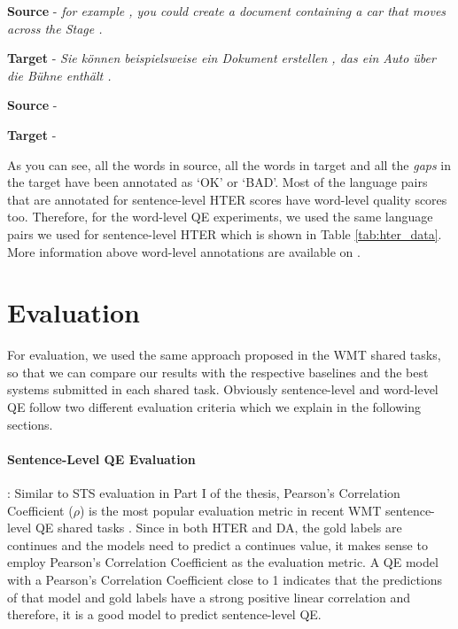 \noindent \textbf{Source} - \textit{for example , you could create a document containing a car that moves across the Stage .}

\noindent \textbf{Target} - \textit{Sie können beispielsweise ein Dokument erstellen , das ein Auto über die Bühne enthält .}


\noindent \textbf{Source} - \textit{  \hlgreen{,}              }



\noindent \textbf{Target} - \textit{             \hlgreen{,}                 }


As you can see, all the words in source, all the words in target and all the \textit{gaps} in the target have been annotated as `OK' or `BAD'.  Most of the language pairs that are annotated for sentence-level HTER scores have word-level quality scores too. Therefore, for the word-level QE experiments, we used the same language pairs we used for sentence-level HTER which is shown in Table \ref{tab:hter_data}. More information above word-level annotations are available on \autocite{specia-etal-2018-findings,fonseca-etal-2019-findings,specia-etal-2020-findings-wmt}.


\section{Evaluation}
\label{sec:qe_evaluation}
For evaluation, we used the same approach proposed in the WMT shared tasks, so that we can compare our results with the respective baselines and the best systems submitted in each shared task. Obviously sentence-level and word-level QE follow two different evaluation criteria which we explain in the following sections. 

\paragraph{Sentence-Level QE Evaluation} : Similar to STS evaluation in Part I of the thesis, Pearson's Correlation Coefficient ($\rho$) is the most popular evaluation metric in recent WMT sentence-level QE shared tasks \autocite{specia-etal-2018-findings,fonseca-etal-2019-findings,specia-etal-2020-findings-wmt}. Since in both HTER and DA, the gold labels are continues and the models need to predict a continues value, it makes sense to employ Pearson's Correlation Coefficient as the evaluation metric. A QE model with a Pearson's Correlation Coefficient close to 1 indicates that the predictions of that model and gold labels have a strong positive linear correlation and therefore, it is a good model to predict sentence-level QE. 


